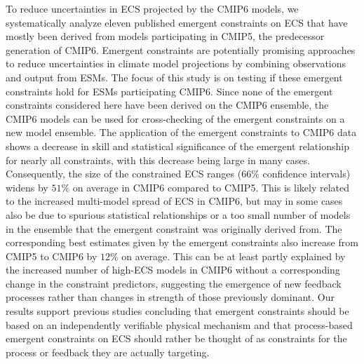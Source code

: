 To reduce uncertainties in \acs{ECS} projected by the \acs{CMIP}6 models, we
systematically analyze eleven published emergent constraints on \acs{ECS} that
have mostly been derived from models participating in \acs{CMIP}5, the
predecessor generation of \acs{CMIP}6. Emergent constraints are potentially
promising approaches to reduce uncertainties in climate model projections by
combining observations and output from \acsp{ESM}. The focus of this study is
on testing if these emergent constraints hold for \acsp{ESM} participating
\acs{CMIP}6. Since none of the emergent constraints considered here have been
derived on the \acs{CMIP}6 ensemble, the \acs{CMIP}6 models can be used for
cross-checking of the emergent constraints on a new model ensemble. The
application of the emergent constraints to \acs{CMIP}6 data shows a decrease in
skill and statistical significance of the emergent relationship for nearly all
constraints, with this decrease being large in many cases. Consequently, the
size of the constrained \acs{ECS} ranges ($66 \unit{\%}$ confidence intervals)
widens by $51 \unit{\%}$ on average in \acs{CMIP}6 compared to \acs{CMIP}5.
This is likely related to the increased multi-model spread of \acs{ECS} in
\acs{CMIP}6, but may in some cases also be due to spurious statistical
relationships or a too small number of models in the ensemble that the emergent
constraint was originally derived from. The corresponding best estimates given
by the emergent constraints also increase from \acs{CMIP}5 to \acs{CMIP}6 by
$12 \unit{\%}$ on average. This can be at least partly explained by the
increased number of high-\acs{ECS} models in \acs{CMIP}6 without a
corresponding change in the constraint predictors, suggesting the emergence of
new feedback processes rather than changes in strength of those previously
dominant. Our results support previous studies concluding that emergent
constraints should be based on an independently verifiable physical mechanism
and that process-based emergent constraints on \acs{ECS} should rather be
thought of as constraints for the process or feedback they are actually
targeting.

